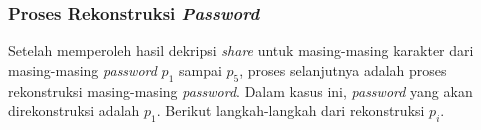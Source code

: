 \subsubsection{Proses Rekonstruksi \textit{Password}}

Setelah memperoleh hasil dekripsi \textit{share} untuk masing-masing karakter dari masing-masing \textit{password} \begin{math}p_1\end{math} sampai \begin{math}p_5\end{math}, proses selanjutnya adalah proses rekonstruksi masing-masing \textit{password}. Dalam kasus ini, \textit{password} yang akan direkonstruksi adalah \begin{math}p_1\end{math}. Berikut langkah-langkah dari rekonstruksi \begin{math}p_i\end{math}.

